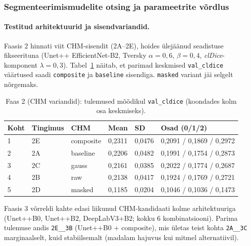 \subsubsection{Segmenteerimismudelite otsing ja parameetrite võrdlus}
\label{segmenteerimise-mudeli-otsing}

\paragraph{Testitud arhitektuurid ja sisendvariandid.}

Faasis 2 hinnati viit CHM-sisendit (2A--2E), hoides ülejäänud seadistuse fikseerituna (Unet++ EfficientNet-B2, Tversky $\alpha{=}0{,}6$, $\beta{=}0{,}4$, \textit{clDice}-komponent $\lambda{=}0{,}3$). Tabel~\ref{tab:seg-phase2} näitab, et parimad keskmised \texttt{val\_cldice} väärtused saadi \texttt{composite} ja \texttt{baseline} sisendiga. \texttt{masked} variant jäi selgelt nõrgemaks.

\begin{table}[h!]
\centering
\caption{Faas 2 (CHM variandid): tulemused mõõdikul \texttt{val\_cldice} (koondades kolm osa keskmiseks).}
\label{tab:seg-phase2}
\begin{tabular}{llllll}
\hline
\textbf{Koht} & \textbf{Tingimus} & \textbf{CHM} & \textbf{Mean} & \textbf{SD} & \textbf{Osad (0/1/2)} \\
\hline
1 & 2E & composite & 0,2311 & 0,0476 & 0,2091 / 0,1869 / 0,2972 \\
2 & 2A & baseline  & 0,2206 & 0,0482 & 0,1991 / 0,1754 / 0,2873 \\
3 & 2C & gauss     & 0,2161 & 0,0385 & 0,2022 / 0,1774 / 0,2687 \\
4 & 2B & raw       & 0,2138 & 0,0417 & 0,1924 / 0,1769 / 0,2721 \\
5 & 2D & masked    & 0,1185 & 0,0204 & 0,1046 / 0,1036 / 0,1473 \\
\hline
\end{tabular}
\end{table}

Faasis 3 võrreldi kahte edasi liikunud CHM-kandidaati kolme arhitektuuriga (Unet++B0, Unet++B2, DeepLabV3+B2; kokku 6 kombinatsiooni). Parima tulemuse andis \texttt{2E\_\_3B} (Unet++B0 + composite), mis ületas teist kohta \texttt{2A\_\_3C} marginaalselt, kuid stabiilsemalt (madalam hajuvus kui mitmel alternatiivil).

